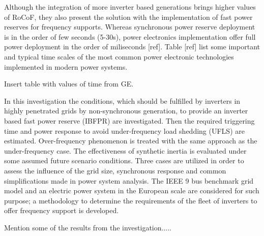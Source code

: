  Although the integration of more inverter based generations brings higher values of RoCoF, they also present the solution with the implementation of fast power reserves for frequency supports. Whereas synchronous power reserve deployment is in the order of few seconds (5-30s), power electronics implementation offer full power deployment in the order of miliseconds [ref]. Table [ref] list some important and typical time scales of the most common power electronic technologies implemented in modern power systems.
 
 Insert table with values of time from GE.
 
 

 
 
 In this investigation the conditions, which should be fulfilled by inverters in highly penetrated grids by non-synchronous generation, to provide an inverter based fast power reserve (IBFPR) are investigated. Then the required triggering time and power response to avoid under-frequency load shedding (UFLS) are estimated. Over-frequency phenomenon is treated with the same approach as the under-frequency case. The effectiveness of synthetic inertia is evaluated under some assumed future scenario conditions. Three cases are utilized in order to assess the influence of the grid size, synchronous response and common simplifications made in power system analysis. The IEEE 9 bus benchmark grid model and an electric power system in the European scale are considered for such purpose; a methodology to determine the requirements of the fleet of inverters to offer frequency support is developed. %

Mention some of the results from the investigation.....